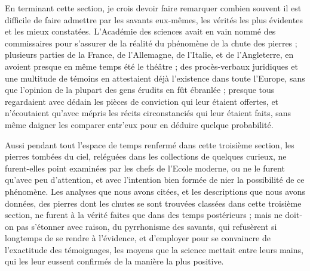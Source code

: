 \documentclass[a4paper, 12pt, oneside, french]{article}
\begin{document}
En terminant cette section, je crois devoir faire remarquer combien souvent il est difficile de faire admettre par les savants eux-mêmes, les vérités les plus évidentes et les mieux constatées. L'Académie des sciences avait en vain nommé des commissaires pour s'assurer de la réalité du phénomène de la chute des pierres ; plusieurs parties de la France, de l'Allemagne, de l'Italie, et de l'Angleterre, en avoient presque en même temps été le théâtre ; des procès-verbaux juridiques et une multitude de témoins en attestaient déjà l'existence dans toute l'Europe, sans que l'opinion de la plupart des gens érudits en fût ébranlée ; presque tous regardaient avec dédain les pièces de conviction qui leur étaient offertes, et n'écoutaient qu'avec mépris les récits circonstanciés qui leur étaient faits, sans même daigner les comparer entr'eux pour en déduire quelque probabilité.

Aussi pendant tout l'espace de temps renfermé dans cette troisième section, les pierres tombées du ciel, reléguées dans les collections de quelques curieux, ne furent-elles point examinées par les chefs de l'Ecole moderne, ou ne le furent qu'avec peu d'attention, et avec l'intention bien formée de nier la possibilité de ce phénomène. Les analyses que nous avons citées, et les descriptions que nous avons données, des pierres dont les chutes se sont trouvées classées dans cette troisième section, ne furent à la vérité faites que dans des temps postérieurs ; mais ne doit-on pas s'étonner avec raison, du pyrrhonisme des savants, qui refusèrent si longtemps de se rendre à l'évidence, et d'employer pour se convaincre de l'exactitude des témoignages, les moyens que la science mettait entre leurs mains, qui les leur eussent confirmés de la manière la plus positive.
\clearpage
\section{}
\end{document}
